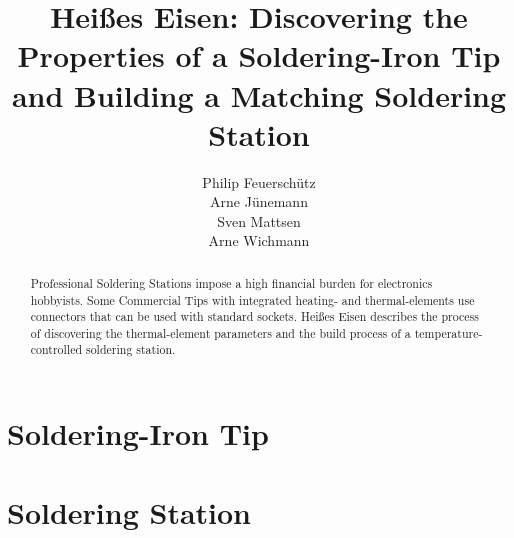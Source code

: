 \documentclass[a4paper]{IEEEconf}
\title{Heißes Eisen: Discovering the Properties of a Soldering-Iron Tip
and Building a Matching Soldering Station}
\author{%
	Philip Feuerschütz\\
	Arne Jünemann\\
	Sven Mattsen\\
	Arne Wichmann\\
}
\begin{document}
 
\maketitle{}
\begin{abstract}
Professional Soldering Stations impose a high financial burden for
electronics hobbyists. Some Commercial Tips with integrated
heating- and thermal-elements use connectors that can be used with
standard sockets. Heißes Eisen describes the process of discovering the
thermal-element parameters and the build process of a
temperature-controlled soldering station.
\end{abstract}

\part{Soldering-Iron Tip}

\part{Soldering Station}
\end{document}
